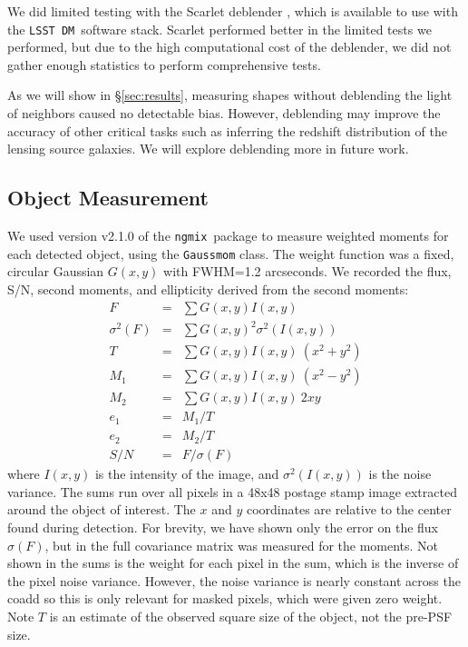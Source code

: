 \documentclass[twocolumn,twocolappendix,astrosym]{openjournal}
\newcommand{\ngmix}{\texttt{ngmix}}
\newcommand{\dm}{\texttt{LSST DM}}
\begin{document}
We did limited testing with the Scarlet deblender \citep{MelchiorScarlet2018},
which is available to use with the \dm\ software stack. Scarlet performed
better in the limited tests we performed, but due to the high computational
cost of the deblender, we did not gather enough statistics to perform
comprehensive tests.

As we will show in \S \ref{sec:results}, measuring shapes without deblending
the light of neighbors caused no detectable bias.  However, deblending may
improve the accuracy of other critical tasks such as inferring the redshift
distribution of the lensing source galaxies.  We will explore deblending more
in future work.

\subsection{Object Measurement} \label{sec:mdet:meas}

We used version v2.1.0 of the \ngmix\ package to measure weighted moments for
each detected object, using the \texttt{Gaussmom} class. The weight function
was a fixed, circular Gaussian $G(x, y)$ with FWHM=1.2 arcseconds.  We
recorded the flux, S/N, second moments, and ellipticity derived from the second
moments:
\begin{eqnarray} \label{eq:moments}
    F &=& \sum G(x, y) I(x, y) \nonumber \\
    \sigma^2(F) &=& \sum G(x, y)^2 \sigma^2(I(x, y)) \nonumber \\
    T &=& \sum G(x, y) I(x, y) ~ (x^2 + y^2) \nonumber \\
    M_1 &=& \sum G(x, y) I(x, y) ~ (x^2 - y^2) \\
    M_2 &=& \sum G(x, y) I(x, y) ~ 2 x y \nonumber \\
    e_1 &=& M_1 / T \nonumber \\
    e_2 &=& M_2 / T \nonumber \\
    S/N &=& F / \sigma(F) \nonumber
\end{eqnarray}
where $I(x, y)$ is the intensity of the image, and $\sigma^2(I(x, y))$ is the
noise variance. The sums run over all pixels in a 48x48 postage stamp image
extracted around the object of interest.  The $x$ and $y$ coordinates are
relative to the center found during detection.  For brevity, we have shown only
the error on the flux $\sigma(F)$, but in the full covariance matrix was
measured for the moments.  Not shown in the sums is the weight for each pixel
in the sum, which is the inverse of the pixel noise variance. However, the
noise variance is nearly constant across the coadd so this is only relevant for
masked pixels, which were given zero weight.  Note $T$ is an estimate of the observed square
size of the object, not the pre-PSF size.
\end{document}
